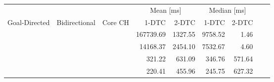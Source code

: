 \begin{tabular}{cccrrrrrr}
	\toprule
	              &               &         & \multicolumn{2}{c}{Mean [\si{\milli\second}]} & \multicolumn{2}{c}{Median [\si{\milli\second}]}                 \\
	Goal-Directed & Bidirectional & Core CH & 1-DTC                                         & 2-DTC                                           & 1-DTC & 2-DTC \\
	\midrule
	\cmark        & \xmark        & \xmark  & 167739.69                                             & 1327.55                                               & 9758.52     & 1.46     \\
	\cmark        & \cmark        & \xmark  & 14168.37                                             & 2454.10                                               & 7532.67     & 4.60     \\
	\xmark        & \cmark        & \cmark  & 321.22                                             & 631.09                                               & 346.76     & 571.64     \\
	\cmark        & \cmark        & \cmark  & 220.41                                             & 455.96                                               & 245.75     & 627.32     \\
	\bottomrule
\end{tabular}